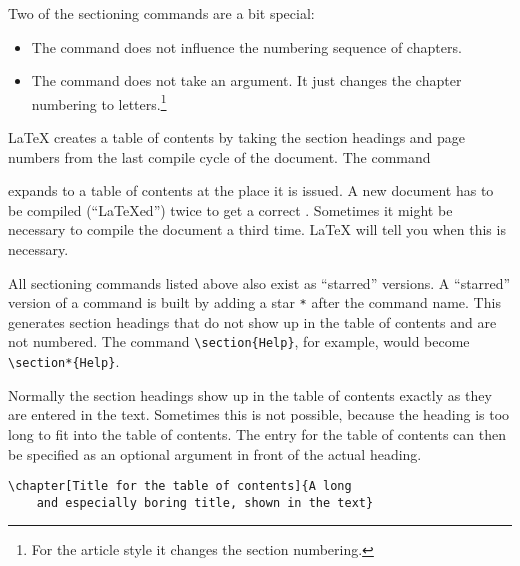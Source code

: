 Two of the sectioning commands are a bit special:
\begin{itemize}
\item The  command does
  not influence the numbering sequence of chapters.
\item The  command does not take an argument. It just
  changes the chapter numbering to letters.\footnote{For the article
    style it changes the section numbering.}
\end{itemize}

\LaTeX{} creates a table of contents by taking the section headings
and page numbers from the last compile cycle of the document. The command
\begin{lscommand}
\end{lscommand}
\noindent expands to a table of contents at the place it
is issued. A new
document has to be compiled (``\LaTeX ed'') twice to get a
correct . Sometimes it might be
necessary to compile the document a third time. \LaTeX{} will tell you
when this is necessary.

All sectioning commands listed above also exist as ``starred''
versions.  A ``starred'' version of a command is built by adding a
star \verb|*| after the command name.  This generates section headings
that do not show up in the table of contents and are not
numbered. The command \verb|\section{Help}|, for example, would become
\verb|\section*{Help}|.

Normally the section headings show up in the table of contents exactly
as they are entered in the text. Sometimes this is not possible,
because the heading is too long to fit into the table of contents. The
entry for the table of contents can then be specified as an
optional argument in front of the actual heading.

\begin{code}
\verb|\chapter[Title for the table of contents]{A long|\\
\verb|    and especially boring title, shown in the text}|
\end{code}

